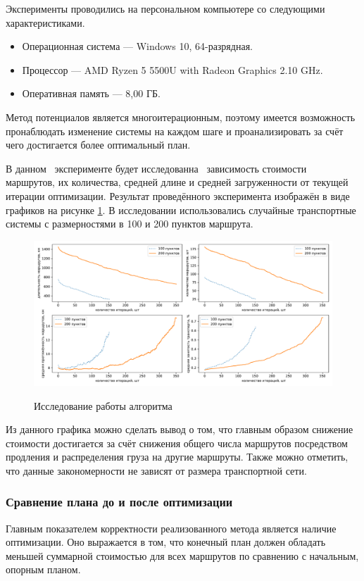 Эксперименты проводились на персональном компьютере со следующими характеристиками.

\begin{itemize}
	\item Операционная система --- Windows 10, 64-разрядная.
	\item Процессор --- AMD Ryzen 5 5500U with Radeon Graphics 2.10 GHz.
	\item Оперативная память --- 8,00 ГБ.
\end{itemize}

Метод потенциалов является многоитерационным, поэтому имеется возможность пронаблюдать изменение системы на каждом шаге и проанализировать за счёт чего достигается более оптимальный план. 

В данном \, эксперименте будет исследованна \, зависимость стоимости \, маршрутов, их количества, средней длине и средней загруженности от текущей итерации оптимизации. Результат проведённого эксперимента изображён в виде графиков на рисунке \ref{exp:iter100}. В исследовании использовались случайные транспортные системы с размерностями в 100 и 200 пунктов маршрута.

\begin{figure}[h!]
	\begin{center}
		{\includegraphics[scale=0.53, angle=0, page=1]{img/research/detailed_report.pdf}}
		\caption{Исследование работы алгоритма}
		\label{exp:iter100}
	\end{center}
\end{figure}

Из данного графика можно сделать вывод о том, что главным образом снижение стоимости достигается за счёт снижения общего числа маршрутов посредством продления и распределения груза на другие маршруты. Также можно отметить, что данные закономерности не зависят от размера транспортной сети.

\subsubsection{Сравнение плана до и после оптимизации}
Главным показателем корректности реализованного метода является наличие оптимизации. Оно выражается в том, что конечный план должен обладать меньшей суммарной стоимостью для всех маршрутов по сравнению с начальным, опорным планом. 

